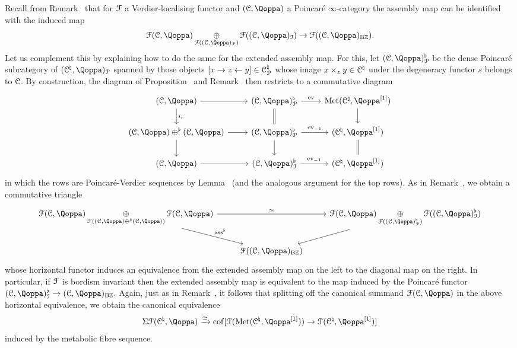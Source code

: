 \begin{remark}
\label{remark:algebraic-splitting-2}%
\label{remark:algebraic-splitting}%
Recall from 
Remark~ that for $\mathcal{F}$ a Verdier-localising functor and $(\C,\QF)$ a Poincaré $\infty$-category 
the assembly map can be identified with the induced map
\[
\F(\C,\QF) \displaystyle\mathop{\oplus}_{\F((\C,\QF)_{\mathcal{P}})} \F((\C,\QF)_\I)  \to \F((\C,\QF)_{\B\ZZ}).
\]
Let us complement this by explaining how to do the same for the extended assembly map.
For this, let $(\C,\QF)^{\flat}_{\mathcal{P}}$ be the dense Poincaré subcategory of $(\C^\natural,\QF)_{\mathcal{P}}$ spanned by those objects $[x \rightarrow z \leftarrow y] \in \mathcal C^{\natural}_{\mathcal{P}}$ whose image $x \times_z y \in \mathcal C^{\natural}$ under the degeneracy functor $s$ belongs to $\mathcal C$. By construction, the diagram of Proposition~ and Remark~ then restricts to a commutative diagram
\[
\begin{tikzcd}
(\C,\QF) \ar[r] \ar[d,"i_r"] & (\C,\QF)^\flat_{\mathcal{P}} \ar[r,"\ev"] \ar[d,equal] & \Met(\C^\natural,\QF\qshift{1}) \ar[d] \\
(\C,\QF)\oplus^{\flat} (\C,\QF) \ar[d]\ar[r] & (\C,\QF)^{\flat}_{\mathcal{P}} \ar[d]\ar[r,"\ev_{-1}"] & (\C^{\natural},\QF\qshift{1}) \ar[d,equal] \\
(\C,\QF) \ar[r] & (\C,\QF)^{\flat}_\I \ar[r,"\ev_{-1}"] & (\C^{\natural},\QF\qshift{1})
\end{tikzcd}
\]
in which the rows are Poincaré-Verdier sequences by Lemma~ (and the analogous argument for the top rows).
As in Remark~, we obtain a commutative triangle 
\[
\begin{tikzcd}
\F(\C,\QF) \displaystyle\mathop{\oplus}_{\F((\C,\QF) \oplus^{\flat} (\C,\QF))} \F(\C,\QF)\ar[dr,"\ass^{\flat}"]\ar[rr,"\simeq"] && \F(\C,\QF) \displaystyle\mathop{\oplus}_{\F((\C,\QF)^{\flat}_{\mathcal{P}})} \F((\C,\QF)^{\flat}_\I)  \ar[dl] \\
& \F((\C,\QF)_{\B\ZZ}) &
\end{tikzcd}
\]
whose horizontal functor induces an equivalence 
from the extended assembly map on the left to the diagonal map on the right. In particular, if $\mathcal{F}$ is bordism invariant then the extended assembly map is equivalent to the map induced by the Poincaré functor $(\C,\QF)^{\flat}_\I \to (\C,\QF)_{\B\ZZ}$. Again, just as in Remark~, it follows that splitting off the canonical summand $\F(\C,\QF)$ in the above horizontal equivalence, we obtain the canonical equivalence
\[
\Sigma\F(\C^\natural,\QF) \xrightarrow{\simeq} \cof[\F(\Met(\C^\natural,\QF\qshift{1})) \to \F(\C^\natural,\QF\qshift{1})]
\]
induced by the metabolic fibre sequence.
\end{remark}


